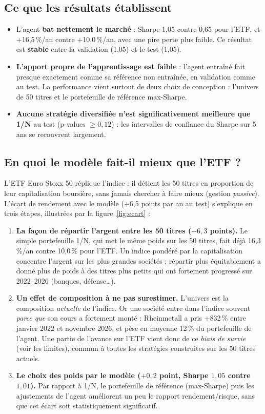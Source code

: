 \documentclass[11pt,a4paper]{article}
\begin{document}
\subsection{Ce que les résultats établissent}
\begin{itemize}
  \item L'agent \textbf{bat nettement le marché} : Sharpe 1,05 contre 0,65 pour l'ETF, et +16,5\,\%/an contre
        +10,0\,\%/an, avec une pire perte plus faible. Ce résultat est \textbf{stable} entre la validation
        (1,05) et le test (1,05).
  \item \textbf{L'apport propre de l'apprentissage est faible} : l'agent entraîné fait presque exactement comme
        sa référence non entraînée, en validation comme au test. La performance vient surtout de deux choix de
        conception : l'univers de 50 titres et le portefeuille de référence max-Sharpe.
  \item \textbf{Aucune stratégie diversifiée n'est significativement meilleure que 1/N} au test
        (p-values \(\ge0{,}12\)) : les intervalles de confiance du Sharpe sur 5 ans se recouvrent largement.
\end{itemize}

\subsection{En quoi le modèle fait-il mieux que l'ETF ?}
L'ETF Euro Stoxx 50 réplique l'indice : il détient les 50 titres en proportion de leur capitalisation boursière,
sans jamais chercher à faire mieux (gestion \emph{passive}). L'écart de rendement avec le modèle (+6,5 points par
an au test) s'explique en trois étapes, illustrées par la figure~\ref{fig:ecart} :

\begin{enumerate}
  \item \textbf{La façon de répartir l'argent entre les 50 titres (\(+6{,}3\) points).} Le simple portefeuille 1/N,
        qui met le même poids sur les 50 titres, fait déjà 16,3\,\%/an contre 10,0\,\% pour l'ETF. Un indice pondéré par
        la capitalisation concentre l'argent sur les plus grandes sociétés ; répartir plus équitablement a donné plus de
        poids à des titres plus petits qui ont fortement progressé sur 2022--2026 (banques, défense\dots).
  \item \textbf{Un effet de composition à ne pas surestimer.} L'univers est la composition \emph{actuelle} de l'indice.
        Or une société entre dans l'indice souvent \emph{parce que} son cours a fortement monté : Rheinmetall a pris
        +832\,\% entre janvier 2022 et novembre 2026, et pèse en moyenne 12\,\% du portefeuille de l'agent. Une partie de
        l'avance sur l'ETF vient donc de ce \emph{biais de survie} (voir les limites), commun à toutes les stratégies
        construites sur les 50 titres actuels.
  \item \textbf{Le choix des poids par le modèle (\(+0{,}2\) point, Sharpe \(1{,}05\) contre \(1{,}01\)).} Par rapport à
        1/N, le portefeuille de référence (max-Sharpe) puis les ajustements de l'agent améliorent un peu le
        rapport rendement/risque, sans que cet écart soit statistiquement significatif.
\end{enumerate}
\end{document}
